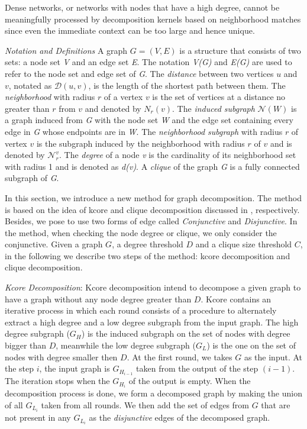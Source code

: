 \documentclass{esannV2}
\begin{document}
Dense networks, or networks with nodes that have a high degree, cannot be
meaningfully processed by decomposition kernels based on neighborhood matches
since even the immediate context can be too large and hence unique.

\textit{Notation and Definitions}
A graph $G = (V,E)$ is a structure that consists of two sets: a node set \textit{V} and an edge set \textit{E}. The notation \textit{V(G)} and \textit{E(G)} are used to refer to the node set and edge set of \textit{G}. The \textit{distance} between two vertices $u$ and $v$, notated as $\mathcal{D}(u,v)$, is the length of the shortest path between them. The \textit{neighborhood} with radius $r$ of a vertex $v$ is the set of vertices at a distance no greater than $r$ from $v$ and denoted by $N_r(v)$. The \textit{induced subgraph} $\mathcal{N}(W)$ is a graph induced from \textit{G} with the node set \textit{W} and the edge set containing every edge in \textit{G} whose endpoints  are in \textit{W}. The \textit{neighborhood subgraph} with radius $r$ of vertex $v$ is the subgraph induced by the neighborhood with radius $r$ of $v$ and is denoted by $\mathcal{N}_{r}^{v}$. The \textit{degree} of a node \textit{v} is the cardinality of its neighborhood set with radius 1 and is denoted as \textit{d(v)}. A \textit{clique} of the graph \textit{G} is a fully connected subgraph of \textit{G}.


In this section, we introduce a new method for graph decomposition. The method is based on the idea of kcore and clique decomposition discussed in \cite{kcore}, \cite{clique} respectively. Besides, we pose to use two forms of edge called \textit{Conjunctive} and \textit{Disjunctive}. In the method, when checking the node degree or clique, we only consider the conjunctive. Given a graph $G$, a degree threshold $D$ and a clique size threshold $C$, in the following we describe two steps of the method: kcore decomposition and clique decomposition.

\textit{Kcore Decomposition}: Kcore decomposition intend to decompose a given graph to have a graph without any node degree greater than $D$. Kcore contains an iterative process in which each round consists of a procedure to alternately extract a high degree and a low degree subgraph from the input graph. The high degree subgraph ($G_H$) is the induced subgraph on the set of nodes with degree bigger than $D$, meanwhile the low degree subgraph ($G_L$) is the one on the set of nodes with degree smaller then $D$. At the first round, we takes $G$ as the input. At the step $i$, the input graph is $G_{H_{i-1}}$ taken from the output 
of the step $(i-1)$. The iteration stops when the $G_{H_{i}}$ of the output is empty. When the decomposition process is done, we form a decomposed graph by making the union of all $G_{L_{i}}$ taken from all rounds. We then add the set of edges from $G$ that are not present in any $G_{L_{i}}$ as the \textit{disjunctive} edges of the decomposed graph. 
\end{document}
